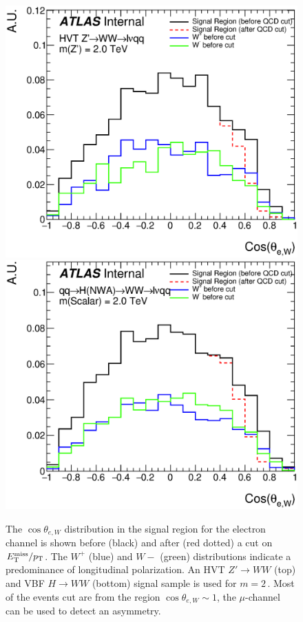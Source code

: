 \begin{figure}[htbp]
\begin{center}
\includegraphics[width=.65\textwidth]{figures/Appendix/h_costhetastar_HVTWW}\\
\includegraphics[width=.65\textwidth]{figures/Appendix/h_costhetastar_VBFWW}
\end{center}
\caption[Cos$\theta_{e,W}$ between electron and W boson before and after QCD cut]{The $\cos\theta_{e,W}$ distribution in the signal region for the electron channel is shown before (black) and after (red dotted) a cut on $E_{\text{T}}^{\text{miss}}/p_{\text{T}}$. The $W^+$ (blue) and $W-$ (green) distributions indicate a predominance of longitudinal polarization. An HVT $Z'\rightarrow WW$ (top) and VBF $H\rightarrow WW$ (bottom) signal sample is used for $m=2$\,\TeV. Most of the events cut are from the region $\cos\theta_{e,W}\sim1$, the $\mu$-channel can be used to detect an asymmetry.}
\label{fig:costhetastar}
\end{figure}

